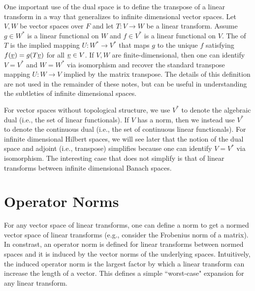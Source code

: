 One important use of the dual space is to define the transpose of a linear transform in a way that generalizes to infinite dimensional vector spaces.
Let $V,W$ be vector spaces over $F$ and let $T \colon V \rightarrow W$ be a linear transform.
Assume $g \in W^*$ is a linear functional on $W$ and $f \in V^*$ is a linear functional on $V$.
The  of $T$ is the implied mapping $U \colon W^* \rightarrow V^*$ that maps $g$ to the unique $f$ satisfying $f(\underline{v})=g(T\underline{v})$ for all $\underline{v}\in V$.
If $V,W$ are finite-dimensional, then one can identify $V=V^*$ and $W=W^*$ via isomorphism and recover the standard transpose mapping $U \colon W \rightarrow V$ implied by the matrix transpose.
The details of this definition are not used in the remainder of these notes, but can be useful in understanding the subtleties of infinite dimensional spaces.

For vector spaces without topological structure, we use $V^*$ to denote the algebraic dual (i.e., the set of linear functionals).
If $V$ has a norm, then we instead use $V^*$ to denote the continuous dual (i.e., the set of continuous linear functionals).
For infinite dimensional Hilbert spaces, we will see later that the notion of the dual space and adjoint (i.e., transpose) simplifies because one can identify $V=V^*$ via isomorphism.
The interesting case that does not simplify is that of linear transforms between infinite dimensional Banach spaces.

 


\section{Operator Norms}

For any vector space of linear transforms, one can define a norm to get a normed vector space of linear transforms (e.g., consider the Frobenius norm of a matrix).
In constrast, an operator norm is defined for linear transforms between normed spaces and it is induced by the vector norms of the underlying spaces.
Intuitively, the induced operator norm is the largest factor by which a linear transform can increase the length of a vector.
This defines a simple ``worst-case" expansion for any linear transform.

